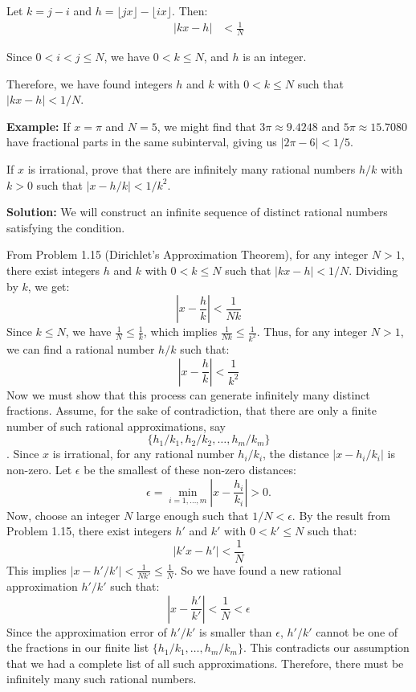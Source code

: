 Let $k = j - i$ and $h = \lfloor jx \rfloor - \lfloor ix \rfloor$. Then:
\begin{align*}
|kx - h| &< \frac{1}{N}
\end{align*}

Since $0 < i < j \leq N$, we have $0 < k \leq N$, and $h$ is an integer.

Therefore, we have found integers $h$ and $k$ with $0 < k \leq N$ such that $|kx - h| < 1/N$.

\textbf{Example:}
If $x = \pi$ and $N = 5$, we might find that $3\pi \approx 9.4248$ and $5\pi \approx 15.7080$ have fractional parts in the same subinterval, giving us $|2\pi - 6| < 1/5$.

\begin{problembox}
If $x$ is irrational, prove that there are infinitely many rational numbers $h/k$ with $k > 0$ such that $|x - h/k| < 1/k^2$.
\end{problembox}
\textbf{Solution:}
We will construct an infinite sequence of distinct rational numbers satisfying the condition.

From Problem 1.15 (Dirichlet's Approximation Theorem), for any integer $N > 1$, there exist integers $h$ and $k$ with $0 < k \leq N$ such that $|kx - h| < 1/N$.
Dividing by $k$, we get:
\[
\left|x - \frac{h}{k}\right| < \frac{1}{Nk}
\]
Since $k \leq N$, we have $\frac{1}{N} \leq \frac{1}{k}$, which implies $\frac{1}{Nk} \leq \frac{1}{k^2}$.
Thus, for any integer $N>1$, we can find a rational number $h/k$ such that:
\[
\left|x - \frac{h}{k}\right| < \frac{1}{k^2}
\]
Now we must show that this process can generate infinitely many distinct fractions.
Assume, for the sake of contradiction, that there are only a finite number of such rational approximations, say $$\{h_1/k_1, h_2/k_2, \ldots, h_m/k_m\}$$.
Since $x$ is irrational, for any rational number $h_i/k_i$, the distance $|x - h_i/k_i|$ is non-zero. Let $\epsilon$ be the smallest of these non-zero distances:
\[
\epsilon = \min_{i=1,\dots,m} \left|x - \frac{h_i}{k_i}\right| > 0.
\]
Now, choose an integer $N$ large enough such that $1/N < \epsilon$.
By the result from Problem 1.15, there exist integers $h'$ and $k'$ with $0 < k' \leq N$ such that:
\[
|k'x - h'| < \frac{1}{N}
\]
This implies $|x - h'/k'| < \frac{1}{Nk'} \leq \frac{1}{N}$.
So we have found a new rational approximation $h'/k'$ such that:
\[
\left|x - \frac{h'}{k'}\right| < \frac{1}{N} < \epsilon
\]
Since the approximation error of $h'/k'$ is smaller than $\epsilon$, $h'/k'$ cannot be one of the fractions in our finite list $\{h_1/k_1, \ldots, h_m/k_m\}$. This contradicts our assumption that we had a complete list of all such approximations.
Therefore, there must be infinitely many such rational numbers.

